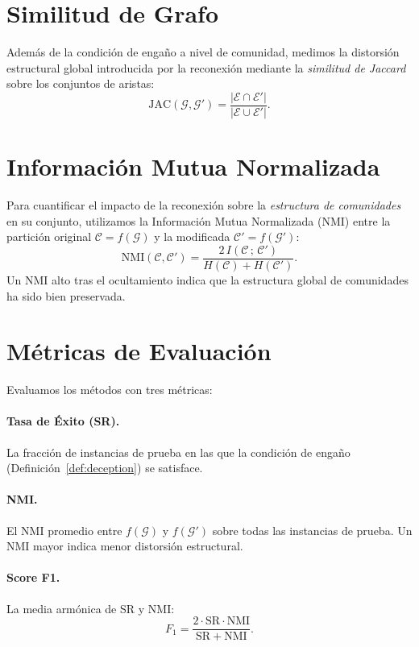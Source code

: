 \documentclass[11pt,a4paper,twoside]{tesis}
\newcommand{\G}{\mathcal{G}}
\newcommand{\E}{\mathcal{E}}
\newcommand{\C}{\mathcal{C}}
\newcommand{\Gnew}{\mathcal{G}'}
\newcommand{\SR}{\mathrm{SR}}
\newcommand{\NMI}{\mathrm{NMI}}
\begin{document}
\section{Similitud de Grafo}
\label{sec:similitud}

Además de la condición de engaño a nivel de comunidad, medimos la distorsión estructural
global introducida por la reconexión mediante la \emph{similitud de Jaccard} sobre los
conjuntos de aristas:
\[
\mathrm{JAC}(\G, \Gnew) = \frac{|\E \cap \E'|}{|\E \cup \E'|}.
\]

\section{Información Mutua Normalizada}
\label{sec:nmi}

Para cuantificar el impacto de la reconexión sobre la \emph{estructura de comunidades}
en su conjunto, utilizamos la Información Mutua Normalizada (NMI) \cite{strehl2003cluster}
entre la partición original $\C = f(\G)$ y la modificada $\C' = f(\Gnew)$:
\[
\NMI(\C, \C') = \frac{2\, I(\C\,;\, \C')}{H(\C) + H(\C')}.
\]
Un NMI alto tras el ocultamiento indica que la estructura global de comunidades ha sido
bien preservada.

\section{Métricas de Evaluación}
\label{sec:metrics}

Evaluamos los métodos con tres métricas:

\paragraph{Tasa de Éxito (SR).} La fracción de instancias de prueba en las que la
condición de engaño (Definición~\ref{def:deception}) se satisface.

\paragraph{NMI.} El NMI promedio entre $f(\G)$ y $f(\Gnew)$ sobre todas las instancias
de prueba. Un NMI mayor indica menor distorsión estructural.

\paragraph{Score F1.} La media armónica de SR y NMI:
\[
F_1 = \frac{2 \cdot \SR \cdot \NMI}{\SR + \NMI}.
\]
\end{document}
